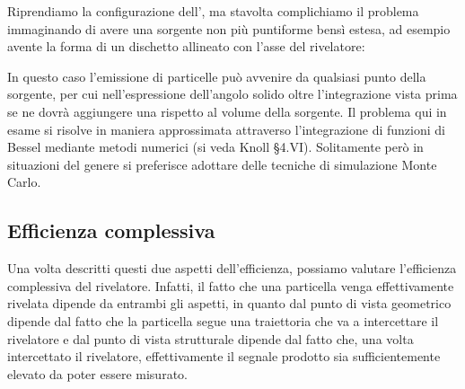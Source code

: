 \begin{esempio}
   Riprendiamo la configurazione dell', ma stavolta complichiamo il problema immaginando di avere una sorgente non più puntiforme bensì estesa, ad esempio avente la forma di un dischetto allineato con l'asse del rivelatore:
   \begin{figure}[H]
      \centering
   \end{figure}
   In questo caso l'emissione di particelle può avvenire da qualsiasi punto della sorgente, per cui nell'espressione dell'angolo solido oltre l'integrazione vista prima se ne dovrà aggiungere una rispetto al volume della sorgente. Il problema qui in esame si risolve in maniera approssimata attraverso l'integrazione di funzioni di Bessel mediante metodi numerici (si veda Knoll \S4.VI). Solitamente però in situazioni del genere si preferisce adottare delle tecniche di simulazione Monte Carlo.
\end{esempio}

\subsection{Efficienza complessiva}
Una volta descritti questi due aspetti dell'efficienza, possiamo valutare l'efficienza complessiva del rivelatore. Infatti, il fatto che una particella venga effettivamente rivelata dipende da entrambi gli aspetti, in quanto dal punto di vista geometrico dipende dal fatto che la particella segue una traiettoria che va a intercettare il rivelatore e dal punto di vista strutturale dipende dal fatto che, una volta intercettato il rivelatore, effettivamente il segnale prodotto sia sufficientemente elevato da poter essere misurato.


